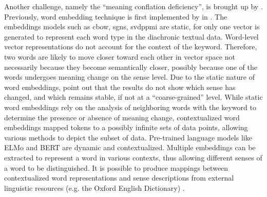 Another challenge, namely the ``meaning conflation deficiency'', is brought up by \textcite{camacho2018survey}. Previously, word embedding technique is first implemented by \citeauthor{mikolov2013efficient} in \cite*{mikolov2013efficient}. The embeddings models such as \gls{cbow}, \gls{sgns}, \gls{svdppmi} are static, for only one vector is generated to represent each word type in the diachronic textual data. Word-level vector representations do not account for the context of the keyword. Therefore, two words are likely to move closer toward each other in vector space not necessarily because they become semantically closer, possibly because one of the words undergoes meaning change on the sense level. Due to the static nature of word embeddings, \textcite{hu2019diachronic} point out that the results do not show which sense has changed, and which remains stable, if not at a ``coarse-grained'' level. While static word embeddings rely on the analysis of neighboring words with the keyword to determine the presence or absence of meaning change, contextualized word embeddings mapped tokens to a possibly infinite sets of data points, allowing various methods to depict the subset of data. Pre-trained language models like ELMo and BERT are dynamic and contextualized. Multiple embeddings can be extracted to represent a word in various contexts, thus allowing different senses of a word to be distinguished. It is possible to produce mappings between contextualized word representations and sense descriptions from external linguistic resources (e.g. the Oxford English Dictionary) \parencite{hu2019diachronic}.

